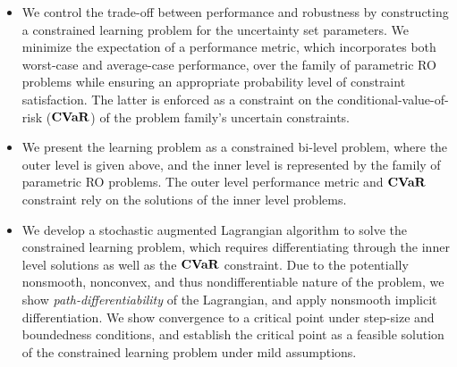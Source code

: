 \documentclass[11pt]{article}
\newcommand{\bsnote}[1]{\noindent\textcolor{red}{\texttt{Bartolomeo: #1}}}
\begin{document}
\begin{itemize}
\item 
We control the trade-off between performance and robustness by constructing a constrained learning problem for the uncertainty set parameters. 
We minimize the expectation of a performance metric, which incorporates both worst-case and average-case performance, over the family of parametric \gls{RO} problems while ensuring an appropriate probability level of constraint satisfaction. The latter is enforced as a constraint on the conditional-value-of-risk ($\mathop{\bf CVaR}$) of the problem family's uncertain constraints.
\item We present the learning problem as a constrained bi-level problem, where the outer level is given above, and the inner level is represented by the family of parametric \gls{RO} problems. The outer level performance metric and $\mathop{\bf CVaR}$ constraint rely on the solutions of the inner level problems. 
 \item We develop a stochastic augmented Lagrangian algorithm to solve the constrained learning problem, which requires differentiating through the inner level solutions as well as the $\mathop{\bf CVaR}$ constraint. Due to the potentially nonsmooth, nonconvex, and thus nondifferentiable nature of the problem, we show {\it path-differentiability} of the Lagrangian, and apply nonsmooth implicit differentiation. We show convergence to a critical point under step-size and boundedness conditions, and establish the critical point as a feasible solution of the constrained learning problem under mild assumptions. 

\end{itemize}
\end{document}
